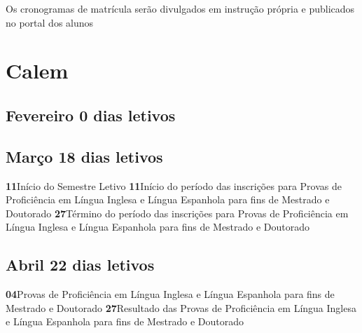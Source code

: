 \documentclass[thesis]{hmcposter}
\begin{document}
\begin{poster}
\begin{center}
\newline
\null
\newline
\begin{table}
\centering
{}
\end{table}
\newline
\null
\newline
Os cronogramas de matrícula serão divulgados em instrução própria e publicados no portal dos alunos
\end{center}
\vfill
\null
\newpage\section{\color{hmcorange}Calem}\subsection{Fevereiro \hfill 0 dias letivos}\subsection{Março \hfill 18 dias letivos}\textbf{11}\qquad Início do Semestre Letivo \newline \null\textbf{11}\qquad Início do período das inscrições para Provas de Proficiência em Língua Inglesa e Língua Espanhola para fins de Mestrado e Doutorado \newline \null\textbf{27}\qquad Término do período das inscrições para Provas de Proficiência em Língua Inglesa e Língua Espanhola para fins de Mestrado e Doutorado \newline \null\subsection{Abril \hfill 22 dias letivos}\textbf{04}\qquad Provas de Proficiência em Língua Inglesa e Língua Espanhola para fins de Mestrado e Doutorado \newline \null\textbf{27}\qquad Resultado das Provas de Proficiência em Língua Inglesa e Língua Espanhola para fins de Mestrado e Doutorado \newline \null\vfill\null
\columnbreak

\end{poster}
\end{document}
